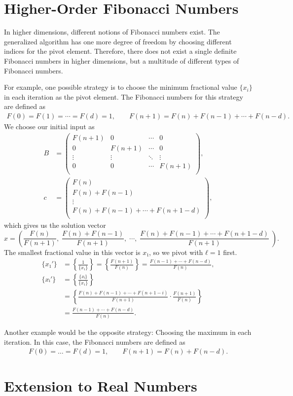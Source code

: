 \section{Higher-Order Fibonacci Numbers}

In higher dimensions, different notions of Fibonacci numbers exist.
The generalized algorithm has one more degree of freedom by choosing different indices for the pivot element.
Therefore, there does not exist a single definite Fibonacci numbers in
higher dimensions, but a multitude of different types of Fibonacci numbers.

For example, one possible strategy is to choose the minimum fractional value
$\{x_i\}$ in each iteration as the pivot element.
The Fibonacci numbers for this strategy are defined as
\begin{align*}
  F(0) = F(1) = ⋯ = F(d) = 1, \qquad F(n + 1) = F(n) + F(n - 1) + ⋯ + F(n - d).
\end{align*}
We choose our initial input as
\begin{align*}
  B & =
  \begin{pmatrix}
    F(n + 1) & 0        & ⋯ & 0 \\
    0        & F(n + 1) & ⋯ & 0 \\
    ⋮        & ⋮        & ⋱ & ⋮ \\
    0 & 0 & ⋯ & F(n + 1) \\
  \end{pmatrix}, \\
  c & =
  \begin{pmatrix}
    F(n) \\
    F(n) + F(n - 1) \\
    ⋮ \\
    F(n) + F(n - 1) + ⋯ + F(n + 1 - d) \\
  \end{pmatrix},
\end{align*}
which gives us the solution vector
\[
  x =
  \left(
    \frac{F(n)}{F(n + 1)},\;
    \frac{F(n) + F(n - 1)}{F(n + 1)},\;
    ⋯,\;
    \frac{F(n) + F(n - 1) + ⋯ + F(n + 1 - d)}{F(n + 1)}\;
  \right).
\]
The smallest fractional value in this vector is $x₁$, so we pivot with $ℓ = 1$ first.
\begin{align*}
  \{x₁'\}
  & = \left\{\frac{1}{\{x₁\}}\right\}
  = \left\{\frac{F(n + 1)}{F(n)}\right\}
  = \frac{F(n - 1) + ⋯ + F(n - d)}{F(n)}, \\
  \{xᵢ'\}
  & = \left\{\frac{\{xᵢ\}}{\{x₁\}}\right\} \\
  & = \left\{\frac{F(n) + F(n - 1) + ⋯ + F(n + 1 - i)}{F(n + 1)} · \frac{F(n + 1)}{F(n)}\right\} \\
  & = \frac{F(n - 1) + ⋯ + F(n - d)}{F(n)}.
\end{align*}

Another example would be the opposite strategy: Choosing the maximum in each iteration.
In this case, the Fibonacci numbers are defined as
\begin{align*}
  F(0) = \dots = F(d) = 1, \qquad F(n + 1) = F(n) + F(n - d).
\end{align*}

\section{Extension to Real Numbers}
